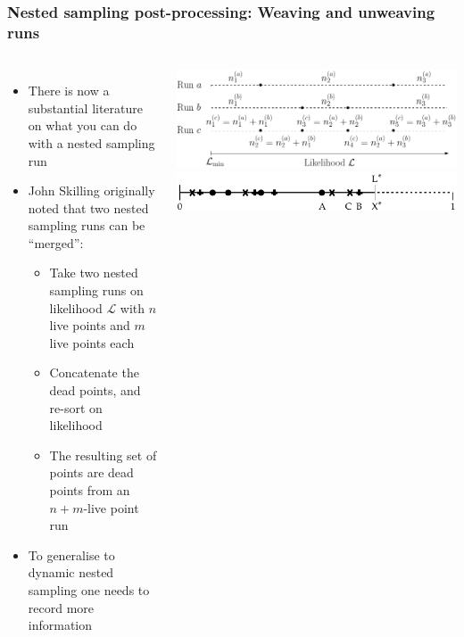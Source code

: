 \documentclass[aspectratio=169,handout]{beamer}
\begin{document}
\begin{frame}
    \frametitle{Nested sampling post-processing: Weaving and unweaving runs}
    \begin{columns}
        \begin{itemize}
            \item There is now a substantial literature on what you can do with a nested sampling run 
            \item John Skilling originally noted that two nested sampling runs can be ``merged'':
                \begin{itemize}
                    \item Take two nested sampling runs on likelihood $\mathcal{L}$ with $n$ live points and $m$ live points each
                    \item Concatenate the dead points, and re-sort on likelihood
                    \item The resulting set of points are dead points from an $n+m$-live point run
                \end{itemize}
            \item To generalise to dynamic nested sampling one needs to record more information
        \end{itemize}
        \includegraphics[width=0.8\textheight,angle=270]{figures/combine}
        \hfill
        \includegraphics[width=0.8\textheight,angle=270]{figures/combine_0}
    \end{columns}
\end{frame}
\end{document}
